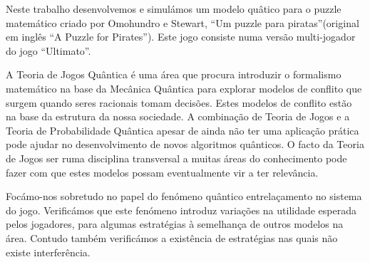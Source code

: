 \begin{resumo}

Neste trabalho desenvolvemos e simul\'{a}mos um modelo qu\^{a}tico para o puzzle matem\'{a}tico criado por Omohundro e Stewart, ``Um puzzle para piratas''(original em ingl\^{e}s ``A Puzzle for Pirates''). Este jogo consiste numa vers\~{a}o multi-jogador do jogo ``Ultimato''. 

A Teoria de Jogos Qu\^{a}ntica \'{e} uma \'{a}rea que procura introduzir o formalismo matem\'{a}tico na base da Mec\^{a}nica Qu\^{a}ntica para explorar modelos de conflito que surgem quando seres racionais tomam decis\~{o}es. Estes modelos de conflito est\~{a}o na base da estrutura da nossa sociedade. A combina\c{c}\~{a}o de Teoria de Jogos e a Teoria de Probabilidade Qu\^{a}ntica apesar de ainda n\~{a}o ter uma aplica\c{c}\~{a}o pr\'{a}tica pode ajudar no desenvolvimento de novos algoritmos qu\^{a}nticos. O facto da Teoria de Jogos ser ruma disciplina transversal a muitas \'{a}reas do conhecimento pode fazer com que estes modelos possam eventualmente vir a ter relev\^{a}ncia.

Foc\'{a}mo-nos sobretudo no papel do fen\'{o}meno qu\^{a}ntico entrela\c{c}amento no sistema do jogo. Verific\'{a}mos que este fen\'{o}meno introduz varia\c{c}\~{o}es na utilidade esperada pelos jogadores, para algumas estrat\'{e}gias \`{a} semelhan\c{c}a de outros modelos na \'{a}rea. Contudo também verific\'{a}mos a exist\^{e}ncia de estrat\'{e}gias nas quais n\~{a}o existe interfer\^{e}ncia.



\end{resumo}